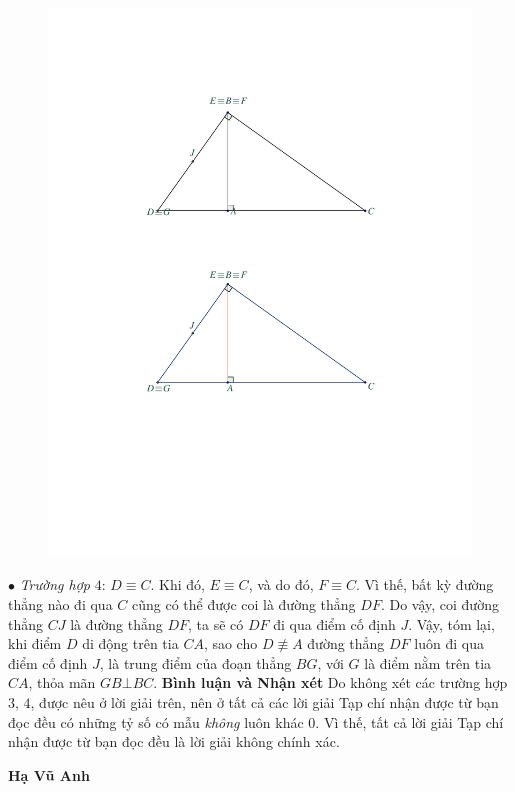 \begin{multicols}{2}
\begin{figure}[H]
		\includegraphics[width=0.9\linewidth]{P615H2}
		\vspace*{-15pt}
	\end{figure}
	$\bullet$ \textit{Trường hợp} $4$: $D \equiv C$.
	\vskip 0.05cm
	Khi đó, $E \equiv C$, và do đó, $F \equiv C$. Vì thế, bất kỳ đường thẳng nào đi qua $C$ cũng có thể được coi là đường thẳng $DF$. Do vậy, coi đường thẳng $CJ$ là đường thẳng $DF$, ta sẽ có $DF$ đi qua điểm cố định $J$.
	\vskip 0.05cm
	Vậy, tóm lại, khi điểm $D$ di động trên tia $CA$, sao cho  $D \not\equiv A$ đường thẳng $DF$ luôn đi qua điểm cố định $J$, là trung điểm của đoạn thẳng $BG$, với $G$ là điểm nằm trên tia $CA$, thỏa mãn $GB \bot BC$.
	\vskip 0.05cm
	\textbf{\color{thachthuctoanhoc}Bình luận và Nhận xét}
	\vskip 0.05cm
	Do không xét các trường hợp $3$, $4$, được nêu ở lời giải trên, nên ở tất cả các lời giải Tạp chí nhận được từ bạn đọc đều có những tỷ số có mẫu \textit{không} luôn khác $0$. Vì thế, tất cả lời giải Tạp chí nhận được từ bạn đọc đều là lời giải không chính xác.
	\begin{flushright}
		\textbf{\color{thachthuctoanhoc}Hạ Vũ Anh}
	\end{flushright}
	{}

\end{multicols}
